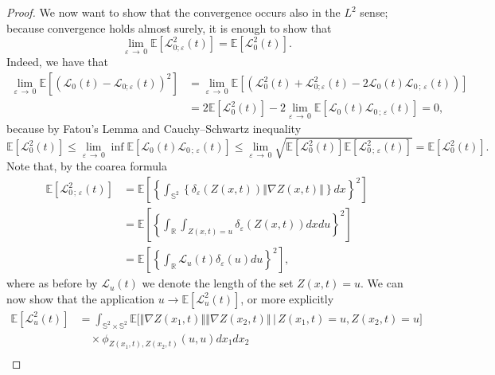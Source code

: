\documentclass[AHL,Unicode,longabstracts,published]{cedram}
\newcommand{\clL}{\mathcal{L}}
\newcommand{\bbS}{\mathbb{S}}
\newcommand{\bbR}{\mathbb{R}}
\newcommand{\bbE}{\mathbb{E}}
\begin{document}
\begin{proof}
We now want to show that the convergence occurs also in the $L^{2}$ sense; because convergence holds almost surely, it is enough to show that
\begin{equation*}
\lim_{\varepsilon\,\rightarrow\,0}\bbE\left[\clL_{0;\varepsilon }^{2}(t)\right] =\bbE\left[\clL_{0}^{2}(t)\right] \text{.}
\end{equation*}
Indeed, we have that
\begin{align*}
\lim_{\varepsilon\,\rightarrow\,0}\bbE\left[\left(\clL_{0}(t)-\clL_{0;\varepsilon }(t)\right)^{2}\right] &=\lim_{\varepsilon\,
\rightarrow\,0}\bbE\left[\left(\clL_{0}^{2}(t)+\clL_{0;\varepsilon}^{2}(t)-2\clL_{0}(t)\clL_{0\,;\,\varepsilon}(t)
\right)\right] \\
&=2\bbE\left[\clL_{0}^{2}(t)\right] -2\lim_{\varepsilon
\,\rightarrow\,0}\bbE\left[\clL_{0}(t)\clL_{0\,;\,\varepsilon }(t)\right] =0\text{,}
\end{align*}
because by Fatou's Lemma and Cauchy--Schwartz inequality
\begin{equation*}
\bbE\left[\clL_{0}^{2}(t)\right] \leq \lim_{\varepsilon
\,\rightarrow\,0}\inf \bbE\left[\clL_{0}(t)\clL _{0\,;\,\varepsilon}(t)\right] \leq \lim_{\varepsilon\,\rightarrow\,0}\sqrt{
\bbE\left[\clL_{0}^{2}(t)\right] \bbE\left[\clL _{0\,;\,\varepsilon}^{2}(t)\right] }=\bbE\left[\clL_{0}^{2}(t)
\right] \text{.}
\end{equation*}
Note that, by the coarea formula
\begin{align*}
\bbE\left[\clL_{0\,;\,\varepsilon}^{2}(t)\right] &=\bbE
\left[\left\{\int_{\bbS^{2}}\left\{\delta_{\varepsilon }(Z(x,t))\left\Vert \nabla Z(x,t)\right\Vert \right\} dx\right\} ^{2}\right]
\\
&=\bbE\left[\left\{\int_{\bbR}\int_{Z(x,t)=u}\delta _{\varepsilon }(Z(x,t))dxdu\right\}^{2}\right] \\
&=\bbE\left[\left\{\int_{\bbR}\clL_{u}(t)\delta _{\varepsilon }(u)du\right\}^{2}\right] \text{,}
\end{align*}
where as before by $\clL_{u}(t)$ we denote the length of the set $ Z(x,t)=u.$ We can now show that the application $u\rightarrow \bbE
\left[\clL_{u}^{2}(t)\right] $, or more explicitly
\begin{align*}
\bbE\left[\clL_{u}^{2}(t)\right] &=\int_{\bbS^{2}\times
\bbS^{2}}\bbE\Big[ \left\Vert \nabla Z(x_{1},t)\right\Vert \left\Vert \nabla Z(x_{2},t)\right\Vert \,\Big|\, Z(x_{1},t)=u,Z(x_{2},t)=u\Big]\\
&\quad\times \phi _{Z(x_{1},t),Z(x_{2},t)}(u,u)dx_{1}dx_{2}\\

\end{align*}
\end{proof}
\end{document}
